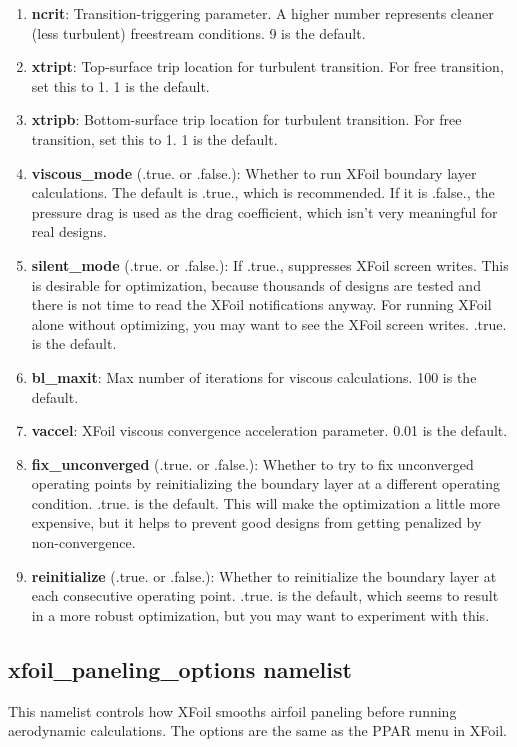 \documentclass[11pt]{article}
\begin{document}
\begin{enumerate}
\item{\textbf{ncrit}: Transition-triggering parameter.  A higher number represents cleaner
(less turbulent) freestream conditions.  9 is the default.}
\item{\textbf{xtript}: Top-surface trip location for turbulent transition.  For free
transition, set this to 1.  1 is the default.}
\item{\textbf{xtripb}: Bottom-surface trip location for turbulent transition.  For free
transition, set this to 1.  1 is the default.}
\item{\textbf{viscous\_mode} (.true. or .false.): Whether to run XFoil boundary layer
calculations.  The default is .true., which is recommended.  If it is .false., the pressure
drag is used as the drag coefficient, which isn't very meaningful for real designs.}
\item{\textbf{silent\_mode} (.true. or .false.): If .true., suppresses XFoil screen writes.
This is desirable for optimization, because thousands of designs are tested and there is
not time to read the XFoil notifications anyway.  For running XFoil alone without
optimizing, you may want to see the XFoil screen writes.  .true. is the default.}
\item{\textbf{bl\_maxit}: Max number of iterations for viscous calculations.  100 is the
default.}
\item{\textbf{vaccel}: XFoil viscous convergence acceleration parameter.  0.01 is the
default.}
\item{\textbf{fix\_unconverged} (.true. or .false.): Whether to try to fix
unconverged operating points by reinitializing the boundary layer at a different operating
condition.  .true. is the default.  This will make the optimization a little more
expensive, but it helps to prevent good designs from getting penalized by
non-convergence.}
\item{\textbf{reinitialize} (.true. or .false.): Whether to reinitialize the boundary
layer at each consecutive operating point.  .true. is the default, which seems to result 
in a more robust optimization, but you may want to experiment with this.}
\end{enumerate}

\subsection{xfoil\_paneling\_options namelist}

This namelist controls how XFoil smooths airfoil paneling before running aerodynamic
calculations.  The options are the same as the PPAR menu in XFoil.
\end{document}

